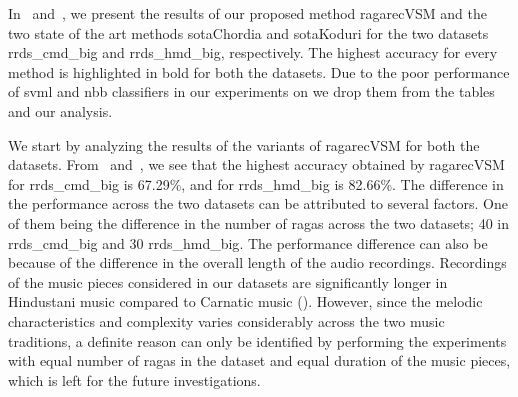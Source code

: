 In~ and~, we present the results of our proposed method \acrshort{ragarecVSM} and the two state of the art methods \acrshort{sotaChordia} and \acrshort{sotaKoduri} for the two datasets \acrshort{rrds_cmd_big} and \acrshort{rrds_hmd_big}, respectively. The highest accuracy for every method is highlighted in bold for both the datasets. Due to the poor performance of \acrshort{svml} and \acrshort{nbb} classifiers in our experiments on we drop them from the tables and our analysis. 

We start by analyzing the results of the variants of \acrshort{ragarecVSM} for both the datasets. From~ and~, we see that the highest accuracy obtained by \acrshort{ragarecVSM} for \acrshort{rrds_cmd_big} is 67.29\%, and for \acrshort{rrds_hmd_big} is 82.66\%. The difference in the performance across the two datasets can be attributed to several factors. One of them being the difference in the number of \glspl{raga} across the two datasets; 40 in  \acrshort{rrds_cmd_big} and 30  \acrshort{rrds_hmd_big}. The performance difference can also be because of the difference in the overall length of the audio recordings. Recordings of the music pieces considered in our datasets are significantly longer in Hindustani music compared to Carnatic music (). However, since the melodic characteristics and complexity varies considerably across the two music traditions, a definite reason can only be identified by performing the experiments with equal number of \glspl{raga} in the dataset and equal duration of the music pieces, which is left for the future investigations. 

